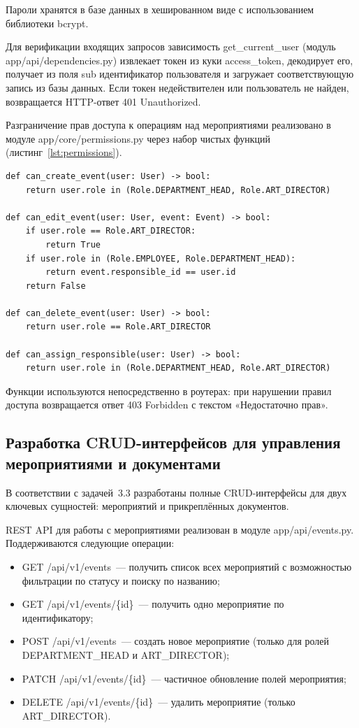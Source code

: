 Пароли хранятся в базе данных в хешированном виде с использованием
библиотеки bcrypt.

Для верификации входящих запросов зависимость
get\_current\_user (модуль app/api/dependencies.py)
извлекает токен из куки access\_token, декодирует его,
получает из поля sub идентификатор пользователя и загружает
соответствующую запись из базы данных. Если токен недействителен
или пользователь не найден, возвращается HTTP-ответ
401 Unauthorized.

Разграничение прав доступа к операциям над мероприятиями реализовано в
модуле app/core/permissions.py через набор чистых функций
(листинг~\ref{lst:permissions}).

\begin{lstlisting}[caption={Функции проверки прав доступа}, label={lst:permissions}]
def can_create_event(user: User) -> bool:
    return user.role in (Role.DEPARTMENT_HEAD, Role.ART_DIRECTOR)

def can_edit_event(user: User, event: Event) -> bool:
    if user.role == Role.ART_DIRECTOR:
        return True
    if user.role in (Role.EMPLOYEE, Role.DEPARTMENT_HEAD):
        return event.responsible_id == user.id
    return False

def can_delete_event(user: User) -> bool:
    return user.role == Role.ART_DIRECTOR

def can_assign_responsible(user: User) -> bool:
    return user.role in (Role.DEPARTMENT_HEAD, Role.ART_DIRECTOR)
\end{lstlisting}

Функции используются непосредственно в роутерах: при нарушении
правил доступа возвращается ответ 403 Forbidden с текстом
«Недостаточно прав».
\newpage
\subsection{Разработка CRUD-интерфейсов для управления мероприятиями и документами}

В соответствии с задачей~3.3 разработаны полные CRUD-интерфейсы для
двух ключевых сущностей: мероприятий и прикреплённых
документов.

REST API для работы с мероприятиями реализован в модуле
app/api/events.py. Поддерживаются следующие операции:

\begin{itemize}
    \item GET /api/v1/events~--- получить список всех
          мероприятий с возможностью фильтрации по статусу и поиску
          по названию;
    \item GET /api/v1/events/\{id\}~--- получить одно
          мероприятие по идентификатору;
    \item POST /api/v1/events~--- создать новое мероприятие
          (только для ролей DEPARTMENT\_HEAD и
          ART\_DIRECTOR);
    \item PATCH /api/v1/events/\{id\}~--- частичное обновление
          полей мероприятия;
    \item DELETE /api/v1/events/\{id\}~--- удалить мероприятие
          (только ART\_DIRECTOR).
\end{itemize}


